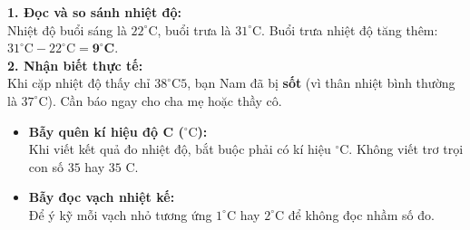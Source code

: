 \documentclass[11pt,a4paper]{article}
\begin{document}
\vspace{-2.5mm}
\noindent
\begin{minipage}[t]{0.49\textwidth}\vspace{0pt}
\begin{tcolorbox}[
  enhanced,
  colback=green!4!white,
  colframe=green!60!black,
  arc=2mm, boxrule=0.8pt,
  left=2mm, right=2mm, top=1.8mm, bottom=1.8mm,
  title={\footnotesize\bfseries\color{white}\faCheckCircle\ Ví dụ thực hành chuẩn mực}
]
{\footnotesize
\textbf{1. Đọc và so sánh nhiệt độ:}\\
Nhiệt độ buổi sáng là $22^\circ\text{C}$, buổi trưa là $31^\circ\text{C}$. Buổi trưa nhiệt độ tăng thêm:\\
$31^\circ\text{C} - 22^\circ\text{C} = \mathbf{9^\circ\text{C}}$.\\
\textbf{2. Nhận biết thực tế:}\\
Khi cặp nhiệt độ thấy chỉ $38^\circ\text{C}5$, bạn Nam đã bị \textbf{sốt} (vì thân nhiệt bình thường là $37^\circ\text{C}$). Cần báo ngay cho cha mẹ hoặc thầy cô.
}
\end{tcolorbox}
\end{minipage}
\hfill
\begin{minipage}[t]{0.49\textwidth}\vspace{0pt}
\begin{tcolorbox}[
  enhanced,
  colback=red!4!white,
  colframe=red!70!black,
  arc=2mm, boxrule=0.8pt,
  left=2mm, right=2mm, top=1.8mm, bottom=1.8mm,
  title={\footnotesize\bfseries\color{white}\faExclamationTriangle\ Mẹo tránh bẫy trắc nghiệm}
]
{\footnotesize
\begin{itemize}\setlength{\itemsep}{1.5pt}\setlength{\leftskip}{-2.5mm}
  \item \textbf{Bẫy quên kí hiệu độ C ($^\circ\text{C}$):}\\
  Khi viết kết quả đo nhiệt độ, bắt buộc phải có kí hiệu $^\circ\text{C}$. Không viết trơ trọi con số $35$ hay $35\text{ C}$.
  \item \textbf{Bẫy đọc vạch nhiệt kế:}\\
  Để ý kỹ mỗi vạch nhỏ tương ứng $1^\circ\text{C}$ hay $2^\circ\text{C}$ để không đọc nhầm số đo.
\end{itemize}
}
\end{tcolorbox}
\end{minipage}
\end{document}
